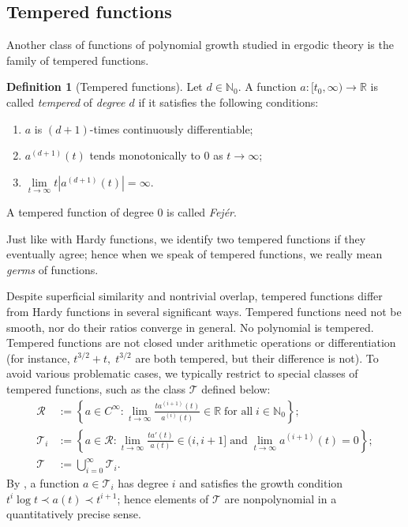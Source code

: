 \documentclass[11pt]{amsart}
\theoremstyle{definition}
\newtheorem{definition}[lemma]{Definition}
\newcommand{\N}{{\mathbb N}}
\newcommand{\R}{{\mathbb R}}
\newcommand{\CR}{{\mathcal R}}
\newcommand{\CT}{{\mathcal T}}
\newcommand{\1}{{\mathbf{1}}}
\newcommand{\rem}[1]{\left \{ #1 \right \}}
\begin{document}
    \subsection{Tempered functions}
    Another class of functions of polynomial growth studied in ergodic theory is the family of tempered functions.
\begin{definition}[Tempered functions]
    Let $d\in\N_0$. A function $a:[t_0,\infty)\to\R$ is called \emph{tempered} of \emph{degree $d$} if it satisfies the following conditions:
    \begin{enumerate}
        \item $a$ is $(d+1)$-times continuously differentiable;
        \item $a^{(d+1)}(t)$ tends monotonically to 0 as $t\to\infty$;
        \item $\lim\limits_{t\to\infty} t |a^{(d+1)}(t)|=\infty$.
    \end{enumerate}
    A tempered function of degree $0$ is called \emph{Fej\'er}.
\end{definition}
Just like with Hardy functions, we identify two tempered functions if they eventually agree; hence when we speak of tempered functions, we really mean \emph{germs} of functions. 

Despite superficial similarity and nontrivial overlap, tempered functions differ from Hardy functions in several significant ways.
Tempered functions need not be smooth, nor do their ratios converge in general. No polynomial is tempered. Tempered functions are not closed under arithmetic operations or differentiation (for instance, $t^{3/2}+t,\; t^{3/2}$ are both tempered, but their difference is not).  
To avoid various problematic cases, we typically restrict to special classes of tempered functions, such as the class $\CT$ defined below:
\begin{align*}
    \CR &:= \rem{a\in C^\infty\colon \lim_{t\to\infty}\frac{ta^{(i+1)}(t)}{a^{(i)}(t)}\in\R\; \textrm{for all}\; i\in\N_0};\\
    \CT_i &:= \rem{a\in \CR\colon \lim_{t\to\infty}\frac{ta'(t)}{a(t)}\in (i,i+1]\; \textrm{and}\; \lim_{t\to\infty}a^{(i+1)}(t) = 0};\\
    \CT &:= \bigcup_{i=0}^\infty \CT_i.
\end{align*}
By \cite{BeHK09}, a function $a\in\CT_i$ has degree $i$ and satisfies the growth condition $t^i \log t \prec a(t) \prec t^{i+1}$; hence elements of $\CT$ are nonpolynomial in a quantitatively precise sense. %
\end{document}
